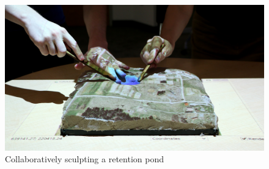 \documentclass{article}
\begin{document}
\begin{figure}
        \centering
        \includegraphics[width=\textwidth]{images/intro/tl_collaboration_s.jpg}
        \caption{Collaboratively sculpting a retention pond}
        \label{fig:intro:collaboration}
\end{figure}

\end{document}
